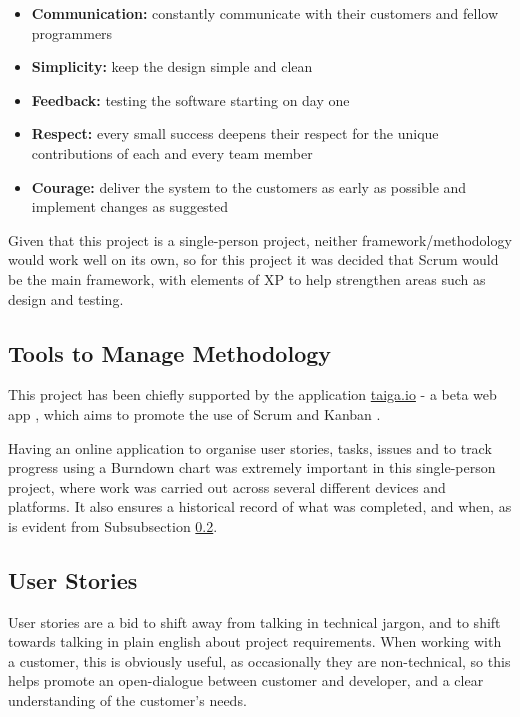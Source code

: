 \begin{itemize}
  \item \textbf{Communication: } constantly communicate with their customers and fellow programmers
  \item \textbf{Simplicity:} keep the design simple and clean
  \item \textbf{Feedback:} testing the software starting on day one
  \item \textbf{Respect: } every small success deepens their respect for the unique contributions of each and every team member
  \item \textbf{Courage: } deliver the system to the customers as early as possible and implement changes as suggested
\end{itemize}

Given that this project is a single-person project, neither framework/methodology would work well on its own, so for this project it was decided that Scrum would be the main framework, with elements of XP to help strengthen areas such as design and testing.

\subsection{Tools to Manage Methodology}

This project has been chiefly supported by the application \url{taiga.io} - a beta web app \cite{Taiga.io}, which aims to promote the use of Scrum and Kanban \cite{kanban}.

Having an online application to organise user stories, tasks, issues and to track progress using a Burndown chart was extremely important in this single-person project, where work was carried out across several different devices and platforms. It also ensures a historical record of what was completed, and when, as is evident from Subsubsection \ref{ssec:user-stories}.

\subsection{User Stories}
\label{ssec:user-stories}

User stories are a bid to shift away from talking in technical jargon, and to shift towards talking in plain english about project requirements. When working with a customer, this is obviously useful, as occasionally they are non-technical, so this helps promote an open-dialogue between customer and developer, and a clear understanding of the customer's needs.

